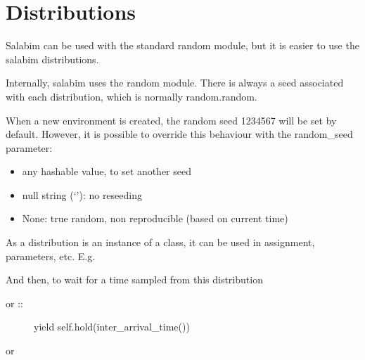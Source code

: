 \documentclass[letterpaper,10pt,english]{sphinxmanual}
\begin{document}
\chapter{Distributions}
\label{\detokenize{Distributions:distributions}}\label{\detokenize{Distributions::doc}}
Salabim can be used with the standard random module, but it is easier to use the salabim distributions.

Internally, salabim uses the random module. There is always a seed associated with each distribution, which
is normally random.random.

When a new environment is created, the random seed 1234567 will be set by default. However, it is possible to
override this behaviour with the random\_seed parameter:
\begin{itemize}
\item {} 
any hashable value, to set another seed

\item {} 
null string (‘’): no reseeding

\item {} 
None: true random, non reproducible (based on current time)

\end{itemize}

As a distribution is an instance of a class, it can be used in assignment, parameters, etc. E.g.

\begin{sphinxVerbatim}[commandchars=\\\{\}]
  
\end{sphinxVerbatim}

And then, to wait for a time sampled from this distribution

\begin{sphinxVerbatim}[commandchars=\\\{\}]
 
\end{sphinxVerbatim}
\begin{description}
\item[{or ::}] \leavevmode
yield self.hold(inter\_arrival\_time())

\end{description}

or
\end{document}
